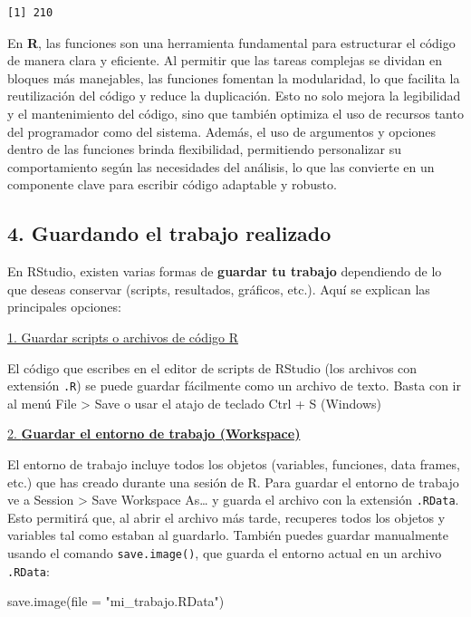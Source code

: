 \documentclass[
  letterpaper,
  DIV=11,
  numbers=noendperiod]{scrartcl}
\newenvironment{Shaded}{\begin{snugshade}}{\end{snugshade}}
\newcommand{\AttributeTok}[1]{\textcolor[rgb]{0.40,0.45,0.13}{#1}}
\newcommand{\FunctionTok}[1]{\textcolor[rgb]{0.28,0.35,0.67}{#1}}
\newcommand{\NormalTok}[1]{\textcolor[rgb]{0.00,0.23,0.31}{#1}}
\newcommand{\StringTok}[1]{\textcolor[rgb]{0.13,0.47,0.30}{#1}}
\begin{document}
\begin{verbatim}
[1] 210
\end{verbatim}

En \textbf{R}, las funciones son una herramienta fundamental para
estructurar el código de manera clara y eficiente. Al permitir que las
tareas complejas se dividan en bloques más manejables, las funciones
fomentan la modularidad, lo que facilita la reutilización del código y
reduce la duplicación. Esto no solo mejora la legibilidad y el
mantenimiento del código, sino que también optimiza el uso de recursos
tanto del programador como del sistema. Además, el uso de argumentos y
opciones dentro de las funciones brinda flexibilidad, permitiendo
personalizar su comportamiento según las necesidades del análisis, lo
que las convierte en un componente clave para escribir código adaptable
y robusto.

\hypertarget{guardando-el-trabajo-realizado}{%
\subsection{4. Guardando el trabajo
realizado}\label{guardando-el-trabajo-realizado}}

En RStudio, existen varias formas de \textbf{guardar tu trabajo}
dependiendo de lo que deseas conservar (scripts, resultados, gráficos,
etc.). Aquí se explican las principales opciones:

\uline{1. Guardar scripts o archivos de código R}

El código que escribes en el editor de scripts de RStudio (los archivos
con extensión \texttt{.R}) se puede guardar fácilmente como un archivo
de texto. Basta con ir al menú File \textgreater{} Save o usar el atajo
de teclado Ctrl + S (Windows)

\uline{2. \textbf{Guardar el entorno de trabajo (Workspace)}}

El entorno de trabajo incluye todos los objetos (variables, funciones,
data frames, etc.) que has creado durante una sesión de R. Para guardar
el entorno de trabajo ve a Session \textgreater{} Save Workspace
As\ldots{} y guarda el archivo con la extensión \texttt{.RData}. Esto
permitirá que, al abrir el archivo más tarde, recuperes todos los
objetos y variables tal como estaban al guardarlo. También puedes
guardar manualmente usando el comando \texttt{save.image()}, que guarda
el entorno actual en un archivo \texttt{.RData}:

\begin{Shaded}
\begin{Highlighting}[]
\FunctionTok{save.image}\NormalTok{(}\AttributeTok{file =} \StringTok{"mi\_trabajo.RData"}\NormalTok{) }
\end{Highlighting}
\end{Shaded}
\end{document}
